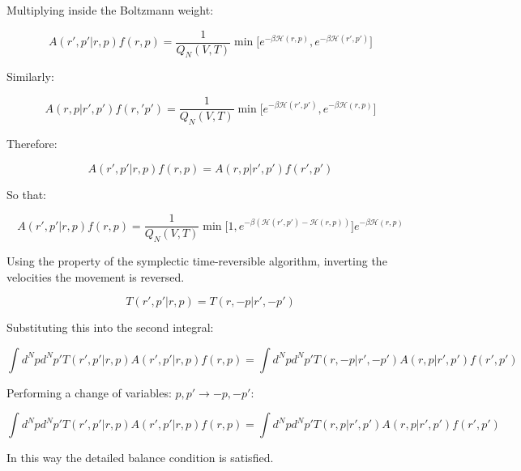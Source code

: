 	Multiplying inside the Boltzmann weight:

	$$A(r',p'|r,p)f(r,p) = \frac{1}{Q_N(V, T)}\min\bigl[e^{-\beta\mathcal{H}(r, p)}, e^{-\beta\mathcal{H}(r', p')}\bigr]$$

	Similarly:

	$$A(r,p|r',p')f(r,'p') = \frac{1}{Q_N(V, T)}\min\bigl[e^{-\beta\mathcal{H}(r', p')}, e^{-\beta\mathcal{H}(r, p)}\bigr]$$

	Therefore:

	$$A(r', p'|r, p)f(r, p) = A(r, p|r', p')f(r',p')$$

	So that:

	$$A(r',p'|r,p)f(r,p) = \frac{1}{Q_N(V, T)}\min\bigl[1, e^{-\beta(\mathcal{H}(r', p')-\mathcal{H}(r,p))}\bigr]e^{-\beta\mathcal{H}(r, p)}$$

	Using the property of the symplectic time-reversible algorithm, inverting the velocities the movement is reversed.

	$$T(r', p'|r, p) = T(r, -p|r', -p')$$

	Substituting this into the second integral:

	$$\int d^Npd^Np'T(r',p'|r, p)A(r', p'|r, p)f(r,p) = \int d^Npd^Np'T(r, -p|r', -p')A(r, p|r', p')f(r', p')$$

	Performing a change of variables: $p, p'\rightarrow -p, -p'$:

	$$\int d^Npd^Np'T(r',p'|r, p)A(r', p'|r, p)f(r,p) = \int d^Npd^Np'T(r,p|r', p')A(r, p|r', p')f(r',p')$$

	In this way the detailed balance condition is satisfied.
